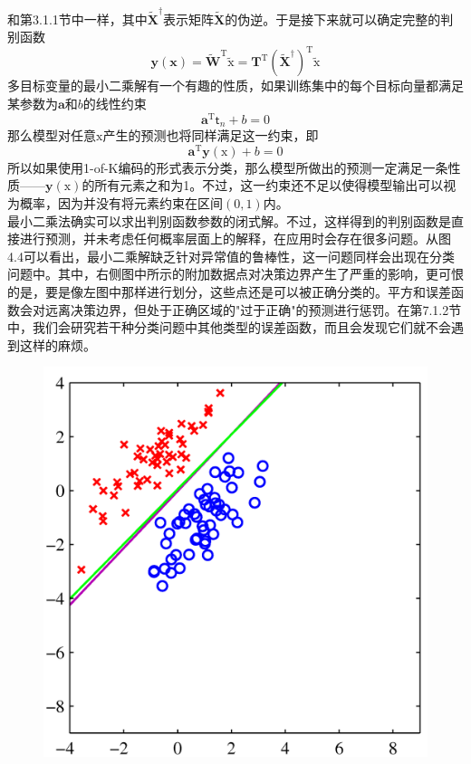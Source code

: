 \documentclass[b5paper]{book}
\numberwithin{equation}{chapter}
\newcommand {\bx} {\boldsymbol{\mathrm{x}}}
\newcommand {\sft} {\boldsymbol{\mathsf{t}}}
\newcommand {\rmT} {\mathrm{T}}
\begin{document}
{	和第3.1.1节中一样，其中$\widetilde{\mathbf{X}}^{\dagger}$表示矩阵$\widetilde{\mathbf{X}}$的伪逆。于是接下来就可以确定完整的判别函数
	\begin{equation}
		\mathbf{y}(\mathbf{x})=\widetilde{\mathbf{W}}^{\rmT}\widetilde{\bx}=\mathbf{T}^{\rmT}\left(\widetilde{\mathbf{X}}^{\dagger}\right)^{\rmT}\widetilde{\bx}
	\end{equation}
	\indent 多目标变量的最小二乘解有一个有趣的性质，如果训练集中的每个目标向量都满足某参数为$\mathbf{a}$和$b$的线性约束
	\begin{equation}
		\mathbf{a}^{\rmT}\sft_n + b = 0
	\end{equation}
	那么模型对任意$\bx$产生的预测也将同样满足这一约束，即
	\begin{equation}
		\mathbf{a}^{\rmT}\mathbf{y}(\bx) + b = 0
	\end{equation}
	所以如果使用1-of-K编码的形式表示分类，那么模型所做出的预测一定满足一条性质——$\mathbf{y}(\bx)$的所有元素之和为1。不过，这一约束还不足以使得模型输出可以视为概率，因为并没有将元素约束在区间$(0,1)$内。\\
	\indent 最小二乘法确实可以求出判别函数参数的闭式解。不过，这样得到的判别函数是直接进行预测，并未考虑任何概率层面上的解释，在应用时会存在很多问题。从图4.4可以看出，最小二乘解缺乏针对异常值的鲁棒性，这一问题同样会出现在分类问题中。其中，右侧图中所示的附加数据点对决策边界产生了严重的影响，更可恨的是，要是像左图中那样进行划分，这些点还是可以被正确分类的。平方和误差函数会对远离决策边界，但处于正确区域的"过于正确"的预测进行惩罚。在第7.1.2节中，我们会研究若干种分类问题中其他类型的误差函数，而且会发现它们就不会遇到这样的麻烦。
	\begin{figure}[H]
		\begin{minipage}[t]{0.5\linewidth}
		\centering
		\includegraphics[scale=0.8]{Images/4-4a.png}

\end{minipage}
\end{figure}}
\end{document}
